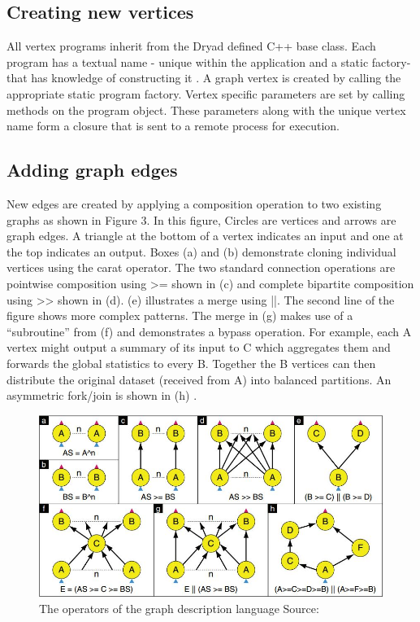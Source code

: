 \documentclass[9pt,twocolumn,twoside]{../../styles/osajnl}
\begin{document}
\subsection{Creating new vertices}
All vertex programs inherit from the Dryad defined C++ base class. Each program has a textual name - unique within the application and a static factory- that has knowledge of constructing it \cite{DryadMSR3}. A graph vertex is created by calling the appropriate static program factory. Vertex specific parameters are set by calling methods on the program object. These parameters along with the unique vertex name form a closure that is sent to a remote process for execution.
\subsection{Adding graph edges}
New edges are created by applying a composition operation to two existing graphs as shown in Figure 3. In this figure, Circles are vertices and arrows are graph edges. A triangle at the bottom of a vertex indicates an input and one at the top indicates an output. Boxes (a) and (b) demonstrate cloning individual vertices using the carat operator. The two standard connection operations are pointwise composition using >= shown in (c) and complete bipartite composition using >> shown in (d). (e) illustrates a merge using ||. The second line of the figure shows more complex patterns. The merge in (g) makes use of a “subroutine” from (f) and demonstrates a bypass operation. For example, each A vertex might output a summary of its input to C which aggregates them and forwards the global statistics to every B. Together the B vertices can then distribute the original dataset (received from A) into balanced partitions. An asymmetric fork/join is shown in (h) \cite{DryadMSR3}.
\begin{figure}[htbp]
\begin{center}
\centering
\includegraphics[width=\linewidth]{images/img3}
\caption{The operators of the graph description language Source:\cite{DryadMSR3}}
\label{fig:false-color}
\end{center}
\end{figure}
\end{document}
